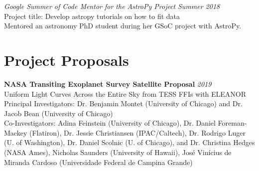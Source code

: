 \documentclass[10pt]{article}
\begin{document}
\begin{titlepage}
\emph{Google Summer of Code Mentor for the AstroPy Project} \hfill \textit{Summer 2018}
\\Project title: Develop astropy tutorials on how to fit data
\\ {\small Mentored an astronomy PhD student during her GSoC project with AstroPy.}
\vspace{.5cm}


\section*{Project Proposals}
    \textbf{NASA Transiting Exoplanet Survey Satellite Proposal}
    \hfill \textit{2019}\\
    Uniform Light Curves Across the Entire Sky from TESS FFIs with ELEANOR\\
    {\small Principal Investigators: Dr. Benjamin Montet (University of Chicago) and Dr. Jacob Bean (University of Chicago)}\\
    {\small Co-Investigators: Adina Feinstein (University of Chicago), Dr. Daniel Foreman-Mackey (Flatiron),
    Dr. Jessie Christiansen (IPAC/Caltech), Dr. Rodrigo Luger (U. of Washington),
    Dr. Daniel Scolnic (U. of Chicago), and Dr. Christina Hedges (NASA Ames),
  Nicholas Saunders (University of Hawaii), Jos\'e Vin\'icius de Miranda Cardoso (Universidade Federal de Campina Grande)}


\end{titlepage}
\end{document}
